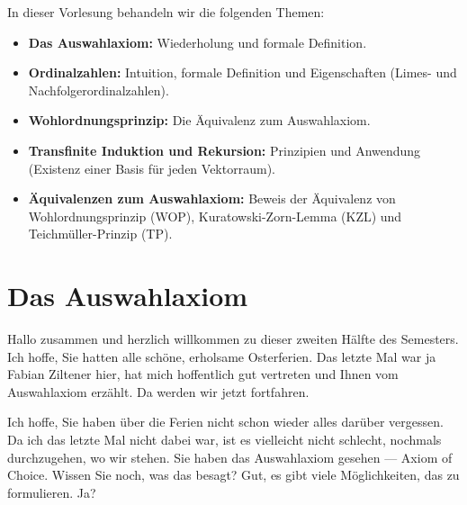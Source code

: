 

\setcounter{chapter}{7}

\begin{nice-box}
In dieser Vorlesung behandeln wir die folgenden Themen:
\begin{itemize}
    \item \textbf{Das Auswahlaxiom:} Wiederholung und formale Definition.
    \item \textbf{Ordinalzahlen:} Intuition, formale Definition und Eigenschaften (Limes- und Nachfolgerordinalzahlen).
    \item \textbf{Wohlordnungsprinzip:} Die Äquivalenz zum Auswahlaxiom.
    \item \textbf{Transfinite Induktion und Rekursion:} Prinzipien und Anwendung (Existenz einer Basis für jeden Vektorraum).
    \item \textbf{Äquivalenzen zum Auswahlaxiom:} Beweis der Äquivalenz von Wohlordnungsprinzip (WOP), Kuratowski-Zorn-Lemma (KZL) und Teichmüller-Prinzip (TP).
\end{itemize}
\end{nice-box}

\section{Das Auswahlaxiom}

\begin{spoken-clean}[00:00:00 - 00:01:00]
Hallo zusammen und herzlich willkommen zu dieser zweiten Hälfte des Semesters. Ich hoffe, Sie hatten alle schöne, erholsame Osterferien. Das letzte Mal war ja Fabian Ziltener hier, hat mich hoffentlich gut vertreten und Ihnen vom Auswahlaxiom erzählt. Da werden wir jetzt fortfahren.

Ich hoffe, Sie haben über die Ferien nicht schon wieder alles darüber vergessen. Da ich das letzte Mal nicht dabei war, ist es vielleicht nicht schlecht, nochmals durchzugehen, wo wir stehen. Sie haben das Auswahlaxiom gesehen --- Axiom of Choice. Wissen Sie noch, was das besagt? Gut, es gibt viele Möglichkeiten, das zu formulieren. Ja?
\end{spoken-clean}

